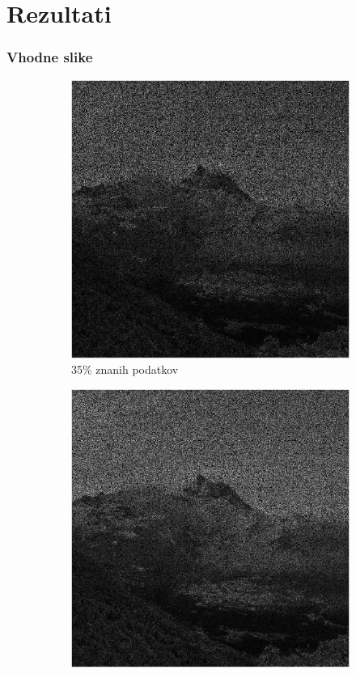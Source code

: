 \documentclass{beamer}
\begin{document}
\section{Rezultati}
\begin{frame}
  \frametitle{Vhodne slike}
  \begin{figure}
    \begin{subfigure}{0.325\linewidth}
      \includegraphics[width=\linewidth]{slike/vhod/slikaInput35.png}
      \caption{35\% znanih podatkov}
    \end{subfigure}
    \begin{subfigure}{0.325\linewidth}
      \includegraphics[width=\linewidth]{slike/vhod/slikaInput45.png}

\end{subfigure}
\end{figure}
\end{frame}
\end{document}
